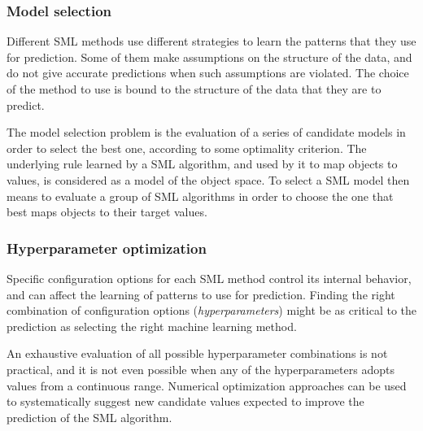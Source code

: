 \subsubsection{Model selection}
	Different SML methods use different strategies to learn the patterns
	that they use for prediction. Some of them make assumptions on the structure of the data, and
	do not give accurate predictions when such assumptions are violated. The choice of the method to
	use is bound to the structure of the data that they are to predict.

	The model selection problem is the evaluation of a series of candidate models in order to select
	the best one, according to some optimality criterion. The underlying rule learned by a SML
	algorithm, and used by it to map objects to values, is considered as a model of the object
	space. To select a SML model then means to evaluate a group of SML algorithms in order to choose
	the one that best maps objects to their target values.

\subsubsection{Hyperparameter optimization}
	Specific configuration options for each SML method control its internal behavior,
	and can affect the learning of patterns to use for prediction. Finding the right combination of
	configuration options (\emph{hyperparameters}) might be as critical to the prediction as
	selecting the right machine learning method.

	An exhaustive evaluation of all possible hyperparameter combinations is not practical, and it is
	not even possible when any of the hyperparameters adopts values from a continuous range.
	Numerical optimization approaches can be used to systematically suggest new candidate values
	expected to improve the prediction of the SML algorithm.
